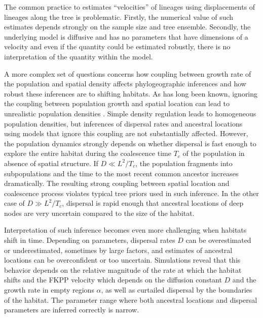 \documentclass[aps,rmp, twocolumn]{revtex4}
\begin{document}
The common practice to estimates ``velocities'' of lineages using displacements of lineages along the tree \citep{dellicour_relax_2021} is problematic.
Firstly, the numerical value of such estimates depends strongly on the sample size and tree ensemble.
Secondly, the underlying model is diffusive and has no parameters that have dimensions of a velocity and even if the quantity could be estimated robustly, there is no interpretation of the quantity within the model.

A more complex set of questions concerns how coupling between growth rate of the population and spatial density affects phylogeographic inferences and how robust these inferences are to shifting habitats.
As has long been known, ignoring the coupling between population growth and spatial location can lead to unrealistic population densities \citep{felsenstein_pain_1975}.
Simple density regulation leads to homogeneous population densities, but inferences of dispersal rates and ancestral locations using models that ignore this coupling are not substantially affected.
However, the population dynamics strongly depends on whether dispersal is fast enough to explore the entire habitat during the coalescence time $T_c$ of the population in absence of spatial structure.
If $D\ll L^2/T_c$, the population fragments into subpopulations and the time to the most recent common ancestor increases dramatically.
The resulting strong coupling between spatial location and coalescence process violates typical tree priors used in such inference.
In the other case of $D\gg L^2/T_c$, dispersal is rapid enough that ancestral locations of deep nodes are very uncertain compared to the size of the habitat.

Interpretation of such inference becomes even more challenging when habitats shift in time.
Depending on parameters, dispersal rates $D$ can be overestimated or underestimated, sometimes by large factors, and estimates of ancestral locations can be overconfident or too uncertain.
Simulations reveal that this behavior depends on the relative magnitude of the rate at which the habitat shifts and the FKPP velocity which depends on the diffusion constant $D$ and the growth rate in empty regions $\alpha$, as well as curtailed dispersal by the boundaries of the habitat.
The parameter range where both ancestral locations and dispersal parameters are inferred correctly is narrow.
\end{document}
